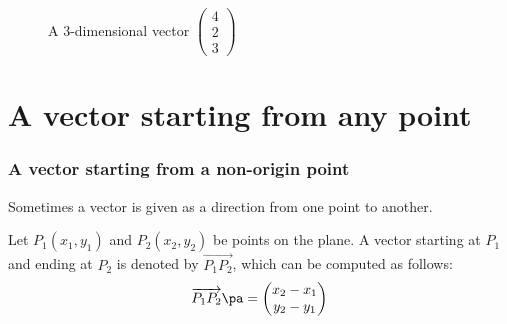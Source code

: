 \begin{frame}
\begin{figure}[h!]
\centering
{}
\caption{A 3-dimensional vector $\begin{pmatrix}4 \\ 2 \\ 3\end{pmatrix}$}
\end{figure}
\end{frame}


\section[Non-origin]{A vector starting from any point}
\frame{\sectionpage}

\begin{frame}
\frametitle{A vector starting from a non-origin point}
Sometimes a vector is given as a direction from one point to another. 

\begin{defn}{}{}
Let $P_1(x_1, y_1)$ and $P_2(x_2, y_2)$ be points on the plane. \pa A vector starting at $P_1$ and ending at $P_2$ is denoted by $\overrightarrow{P_1P_2}$, \pa which can be computed as follows:
\begin{equation}
\overrightarrow{P_1P_2} \pa = \begin{pmatrix}x_2 - x_1 \\ y_2 - y_1\end{pmatrix}
\end{equation} \pa
\end{defn}
\end{frame}


